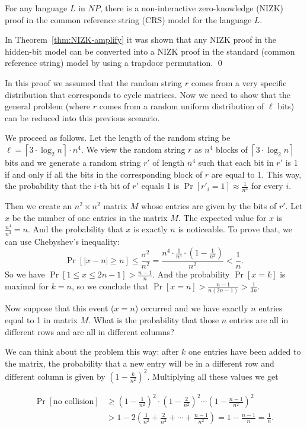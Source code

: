 \documentclass[12pt]{tufte-book}
\begin{document}
\begin{theorem}\label{the:NIZK_NP}
For any language $L$ in $NP$, there is a non-interactive zero-knowledge (NIZK) proof
in the common reference string (CRS) model for the language $L$.
\end{theorem}
\proof
In Theorem~\ref{thm:NIZK-amplify} it was shown that any NIZK proof in the hidden-bit model can
be converted into a NIZK proof in the standard (common reference string) model by using
a trapdoor permutation.
\qed

In this proof we assumed that the random string $r$ comes from a very specific distribution
that corresponds to cycle matrices.
Now we need to show that the general problem (where $r$ comes from a
random uniform distribution of $\ell$ bits) can be reduced into this previous scenario.

We proceed as follows.
Let the length of the random string be
$\ell=\left\lceil 3\cdot \log_2 n\right\rceil \cdot n^4$.
We view the random string $r$ as $n^4$ blocks of $\left\lceil 3\cdot \log_2 n\right\rceil$
bits and we generate a random string $r'$ of length $n^4$ such that each bit in $r'$
is 1 if and only if all the bits in the corresponding block of $r$ are equal to 1.
This way, the probability that the $i$-th bit of $r'$ equals 1 is $\Pr[r'_i=1]\approx\frac{1}{n^3}$ for every $i$.

Then we create an $n^2\times n^2$ matrix $M$ whose entries are given by the bits of $r'$.
Let $x$ be the number of one entries in the matrix $M$.
The expected value for $x$ is $\frac{n^4}{n^3}=n$.
And the probability that $x$ is exactly $n$ is noticeable. To prove that, we can use
Chebyshev's inequality:
$$\Pr[|x-n|\geq n]\leq\frac{\sigma^2}{n^2}=
\frac{n^4\cdot \frac{1}{n^3}\cdot\left(1-\frac{1}{n^3}\right)}{n^2}<\frac{1}{n}.$$
So we have $\Pr[1\leq x\leq 2n-1]>\frac{n-1}{n}$.
And the probability $\Pr[x=k]$ is maximal for $k=n$, so we conclude that
$\Pr[x=n]>\frac{n-1}{n(2n-1)}>\frac{1}{3n}$.

Now suppose that this event ($x=n$) occurred and we have exactly $n$ entries equal to 1
in matrix $M$. What is the probability that those $n$ entries are all in different rows
and are all in different columns?

We can think about the problem this way: after $k$ one entries have been added to the matrix,
the probability that a new entry will be in a different row and different column is given by
$\left(1-\frac{k}{n^2}\right)^2$. Multiplying all these values we get

\begin{align*}
\Pr[\text{no collision}] &\geq \left(1-\frac{1}{n^2}\right)^2 \cdot \left(1-\frac{2}{n^2}\right)^2
\cdots \left(1-\frac{n-1}{n^2}\right)^2 \\
& > 1 - 2\left(\frac{1}{n^2} + \frac{2}{n^2} +\cdots + \frac{n-1}{n^2}\right)
= 1 - \frac{n-1}{n} = \frac{1}{n}.
\end{align*}
\end{document}
